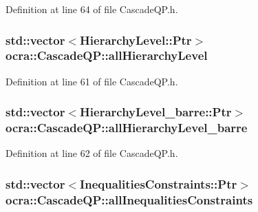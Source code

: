 Definition at line 64 of file Cascade\+Q\+P.\+h.

\subsubsection[{\texorpdfstring{all\+Hierarchy\+Level}{allHierarchyLevel}}]{\setlength{\rightskip}{0pt plus 5cm}std\+::vector$<$Hierarchy\+Level\+::\+Ptr$>$ ocra\+::\+Cascade\+Q\+P\+::all\+Hierarchy\+Level\hspace{0.3cm}{\ttfamily [protected]}}\hypertarget{classocra_1_1CascadeQP_add8c599dd93d116ae57c4c5d05cc2bc1}{}\label{classocra_1_1CascadeQP_add8c599dd93d116ae57c4c5d05cc2bc1}


Definition at line 61 of file Cascade\+Q\+P.\+h.

\subsubsection[{\texorpdfstring{all\+Hierarchy\+Level\+\_\+barre}{allHierarchyLevel_barre}}]{\setlength{\rightskip}{0pt plus 5cm}std\+::vector$<$Hierarchy\+Level\+\_\+barre\+::\+Ptr$>$ ocra\+::\+Cascade\+Q\+P\+::all\+Hierarchy\+Level\+\_\+barre\hspace{0.3cm}{\ttfamily [protected]}}\hypertarget{classocra_1_1CascadeQP_a83636f53370030bbb53359dae1e40833}{}\label{classocra_1_1CascadeQP_a83636f53370030bbb53359dae1e40833}


Definition at line 62 of file Cascade\+Q\+P.\+h.

\subsubsection[{\texorpdfstring{all\+Inequalities\+Constraints}{allInequalitiesConstraints}}]{\setlength{\rightskip}{0pt plus 5cm}std\+::vector$<$Inequalities\+Constraints\+::\+Ptr$>$ ocra\+::\+Cascade\+Q\+P\+::all\+Inequalities\+Constraints\hspace{0.3cm}{\ttfamily [protected]}}\hypertarget{classocra_1_1CascadeQP_a45c98a7eaf861a64c86a789ca524d550}{}\label{classocra_1_1CascadeQP_a45c98a7eaf861a64c86a789ca524d550}


